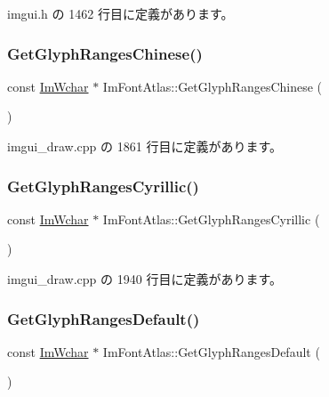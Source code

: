  imgui.\+h の 1462 行目に定義があります。

\mbox{\label{struct_im_font_atlas_afc5807dd42b3a644a9a1e0a95c13cb08}} 
\subsubsection{\texorpdfstring{Get\+Glyph\+Ranges\+Chinese()}{GetGlyphRangesChinese()}}
{\footnotesize\ttfamily const \mbox{\hyperlink{imgui_8h_af2c7badaf05a0008e15ef76d40875e97}{Im\+Wchar}} $\ast$ Im\+Font\+Atlas\+::\+Get\+Glyph\+Ranges\+Chinese (\begin{DoxyParamCaption}{ }\end{DoxyParamCaption})}



 imgui\+\_\+draw.\+cpp の 1861 行目に定義があります。

\mbox{\label{struct_im_font_atlas_a5aaff3357d9ed401ce451c39942e869e}} 
\subsubsection{\texorpdfstring{Get\+Glyph\+Ranges\+Cyrillic()}{GetGlyphRangesCyrillic()}}
{\footnotesize\ttfamily const \mbox{\hyperlink{imgui_8h_af2c7badaf05a0008e15ef76d40875e97}{Im\+Wchar}} $\ast$ Im\+Font\+Atlas\+::\+Get\+Glyph\+Ranges\+Cyrillic (\begin{DoxyParamCaption}{ }\end{DoxyParamCaption})}



 imgui\+\_\+draw.\+cpp の 1940 行目に定義があります。

\mbox{\label{struct_im_font_atlas_adec0df140eb1dc01c2a22a5253d62820}} 
\subsubsection{\texorpdfstring{Get\+Glyph\+Ranges\+Default()}{GetGlyphRangesDefault()}}
{\footnotesize\ttfamily const \mbox{\hyperlink{imgui_8h_af2c7badaf05a0008e15ef76d40875e97}{Im\+Wchar}} $\ast$ Im\+Font\+Atlas\+::\+Get\+Glyph\+Ranges\+Default (\begin{DoxyParamCaption}{ }\end{DoxyParamCaption})}



